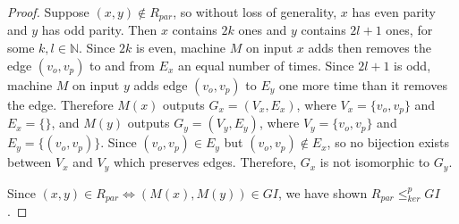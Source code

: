 \documentclass{article}
\theoremstyle{definition}
\newcommand{\kr}{\leq^{p}_{ker}}
\begin{document}
\begin{proof}
  Suppose $(x,y)\notin R_{par}$, so without loss of generality, $x$ has even
  parity and $y$ has odd parity. Then $x$ contains $2k$ ones and $y$ contains
  $2l+1$ ones, for some $k,l\in\mathbb{N}$. Since $2k$ is even, machine $M$ on
  input $x$ adds then removes the edge $(v_o, v_p)$ to and from $E_x$ an equal
  number of times. Since $2l+1$ is odd, machine $M$ on input $y$ adds edge
  $(v_o, v_p)$ to $E_y$ one more time than it removes the edge. Therefore
  $M(x)$ outputs $G_x=(V_x, E_x)$, where $V_x=\{v_o, v_p\}$ and $E_x=\{\}$, and
  $M(y)$ outputs $G_y=(V_y, E_y)$, where $V_y=\{v_o, v_p\}$ and $E_y=\{(v_o,
  v_p)\}$. Since $(v_o, v_p)\in E_y$ but $(v_o, v_p)\notin E_x$, so no
  bijection exists between $V_x$ and $V_y$ which preserves edges. Therefore,
  $G_x$ is not isomorphic to $G_y$.

  Since $(x,y)\in R_{par} \iff (M(x), M(y)) \in GI$, we have shown
  $R_{par} \kr GI$.
\end{proof}
\end{document}

